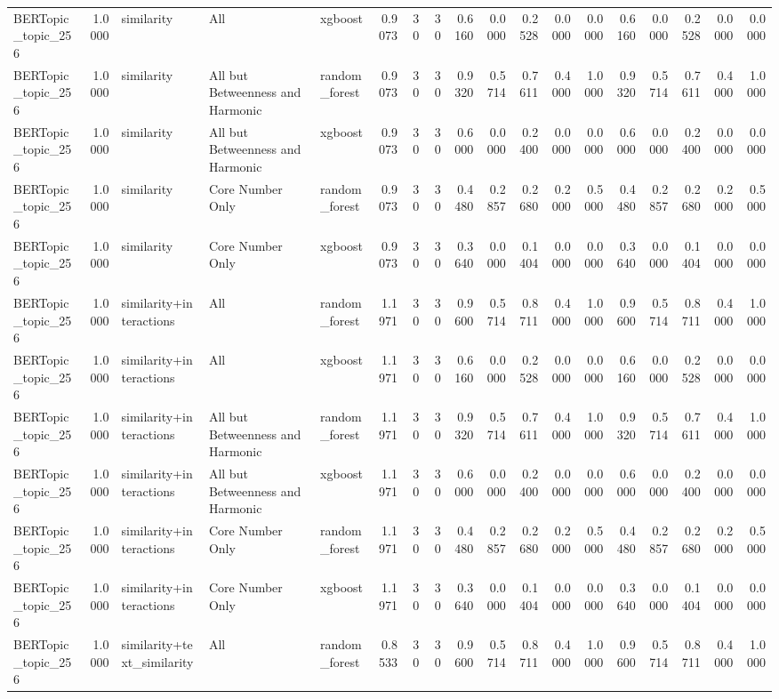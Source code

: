 \begin{tabular}{lrlllrrrrrrrrrrrrr}
BERTopic_topic_256 & 1.0000 & similarity & All & xgboost & 0.9073 & 30 & 30 & 0.6160 & 0.0000 & 0.2528 & 0.0000 & 0.0000 & 0.6160 & 0.0000 & 0.2528 & 0.0000 & 0.0000 \\
BERTopic_topic_256 & 1.0000 & similarity & All but Betweenness and Harmonic & random_forest & 0.9073 & 30 & 30 & 0.9320 & 0.5714 & 0.7611 & 0.4000 & 1.0000 & 0.9320 & 0.5714 & 0.7611 & 0.4000 & 1.0000 \\
BERTopic_topic_256 & 1.0000 & similarity & All but Betweenness and Harmonic & xgboost & 0.9073 & 30 & 30 & 0.6000 & 0.0000 & 0.2400 & 0.0000 & 0.0000 & 0.6000 & 0.0000 & 0.2400 & 0.0000 & 0.0000 \\
BERTopic_topic_256 & 1.0000 & similarity & Core Number Only & random_forest & 0.9073 & 30 & 30 & 0.4480 & 0.2857 & 0.2680 & 0.2000 & 0.5000 & 0.4480 & 0.2857 & 0.2680 & 0.2000 & 0.5000 \\
BERTopic_topic_256 & 1.0000 & similarity & Core Number Only & xgboost & 0.9073 & 30 & 30 & 0.3640 & 0.0000 & 0.1404 & 0.0000 & 0.0000 & 0.3640 & 0.0000 & 0.1404 & 0.0000 & 0.0000 \\
BERTopic_topic_256 & 1.0000 & similarity+interactions & All & random_forest & 1.1971 & 30 & 30 & 0.9600 & 0.5714 & 0.8711 & 0.4000 & 1.0000 & 0.9600 & 0.5714 & 0.8711 & 0.4000 & 1.0000 \\
BERTopic_topic_256 & 1.0000 & similarity+interactions & All & xgboost & 1.1971 & 30 & 30 & 0.6160 & 0.0000 & 0.2528 & 0.0000 & 0.0000 & 0.6160 & 0.0000 & 0.2528 & 0.0000 & 0.0000 \\
BERTopic_topic_256 & 1.0000 & similarity+interactions & All but Betweenness and Harmonic & random_forest & 1.1971 & 30 & 30 & 0.9320 & 0.5714 & 0.7611 & 0.4000 & 1.0000 & 0.9320 & 0.5714 & 0.7611 & 0.4000 & 1.0000 \\
BERTopic_topic_256 & 1.0000 & similarity+interactions & All but Betweenness and Harmonic & xgboost & 1.1971 & 30 & 30 & 0.6000 & 0.0000 & 0.2400 & 0.0000 & 0.0000 & 0.6000 & 0.0000 & 0.2400 & 0.0000 & 0.0000 \\
BERTopic_topic_256 & 1.0000 & similarity+interactions & Core Number Only & random_forest & 1.1971 & 30 & 30 & 0.4480 & 0.2857 & 0.2680 & 0.2000 & 0.5000 & 0.4480 & 0.2857 & 0.2680 & 0.2000 & 0.5000 \\
BERTopic_topic_256 & 1.0000 & similarity+interactions & Core Number Only & xgboost & 1.1971 & 30 & 30 & 0.3640 & 0.0000 & 0.1404 & 0.0000 & 0.0000 & 0.3640 & 0.0000 & 0.1404 & 0.0000 & 0.0000 \\
BERTopic_topic_256 & 1.0000 & similarity+text_similarity & All & random_forest & 0.8533 & 30 & 30 & 0.9600 & 0.5714 & 0.8711 & 0.4000 & 1.0000 & 0.9600 & 0.5714 & 0.8711 & 0.4000 & 1.0000 \\

\end{tabular}
